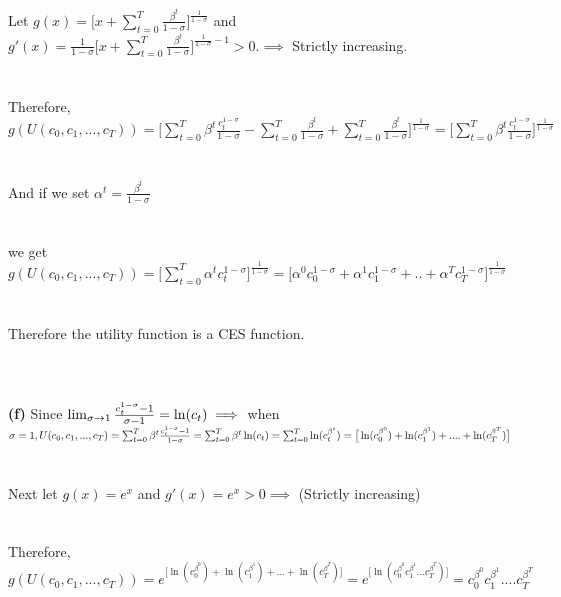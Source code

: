\documentclass[11zpt]{article}
\newenvironment{problem}[2][Problem]{\begin{trivlist}
\item[\hskip \labelsep {\bfseries #1}\hskip \labelsep {\bfseries #2.}]}{\end{trivlist}}
\begin{document}
\begin{problem}{1}
Let $g(x) = \big[ x +  \sum_{t=0}^{T}  \frac{\beta^t }{1-\sigma} \big]^{\frac{1}{1-\sigma}}$ and $g'(x) = \frac{1}{1-\sigma} \big[ x +  \sum_{t=0}^{T}  \frac{\beta^t }{1-\sigma} \big]^{\frac{1}{1-\sigma}-1} > 0. \implies $ Strictly increasing. 
\\
\\
\\
Therefore, $g(U(c_0, c_1, ..., c_T)) = \big[ \sum_{t=0}^{T} \beta^t  \frac{c_t^{1- \sigma}}{1-\sigma} - \sum_{t=0}^{T}  \frac{\beta^t }{1-\sigma} +  \sum_{t=0}^{T}  \frac{\beta^t }{1-\sigma} \big]^{\frac{1}{1-\sigma}} = \big[ \sum_{t=0}^{T} \beta^t  \frac{c_t^{1- \sigma}}{1-\sigma} \big]^{\frac{1}{1-\sigma}}$ 
\\
\\
\\
And if we set $\alpha^t = \frac{\beta^t }{1-\sigma}$
\\
\\
\\
we get $ g(U(c_0, c_1, ..., c_T)) = \big[ \sum_{t=0}^{T} \alpha^t  c_t^{1- \sigma} \big]^{\frac{1}{1-\sigma}} = \big[ \alpha^0  c_0^{1- \sigma} +  \alpha^1  c_1^{1- \sigma} + ..+  \alpha^T  c_T^{1- \sigma}   \big]^{\frac{1}{1-\sigma}}$
\\
\\
\\
Therefore the utility function is a CES function. 
\\
\\
\\
\\
\textbf{(f)} Since $\lim_{\sigma \to 1} \frac{c_t^{1-\sigma}- 1}{\sigma - 1} = \ln(c_t) 
\\ 
\\
\implies $ when $\sigma = 1, 
\\ 
U(c_0, c_1, ..., c_T) = \sum_{t=0}^{T} \beta^t  \frac{c_t^{1- \sigma} - 1}{1-\sigma} = \sum_{t=0}^{T} \beta^t  \ln(c_t) = \sum_{t=0}^{T}  \ln(c_t^{\beta^t}) = \big[\ln(c_0^{\beta^0}) + \ln(c_1^{\beta^1}) + ....+ \ln(c_T^{\beta^T}) \big]$
\\
\\
\\
Next let $ g(x) = e^x $ and $g'(x) = e^x > 0 \implies $ (Strictly increasing)
\\
\\
\\
Therefore, $g(U(c_0, c_1, ..., c_T)) =  e^{\big[\ln(c_0^{\beta^0}) + \ln(c_1^{\beta^1})+ ...+ \ln(c_T^{\beta^T}) \big]} = e^{\big[\ln(c_0^{\beta^0} c_1^{\beta^1} ... c_T^{\beta^T}) \big]} = c_0^{\beta^0} c_1^{\beta^1} .... c_T^{\beta^T}$

\end{problem}
\end{document}
